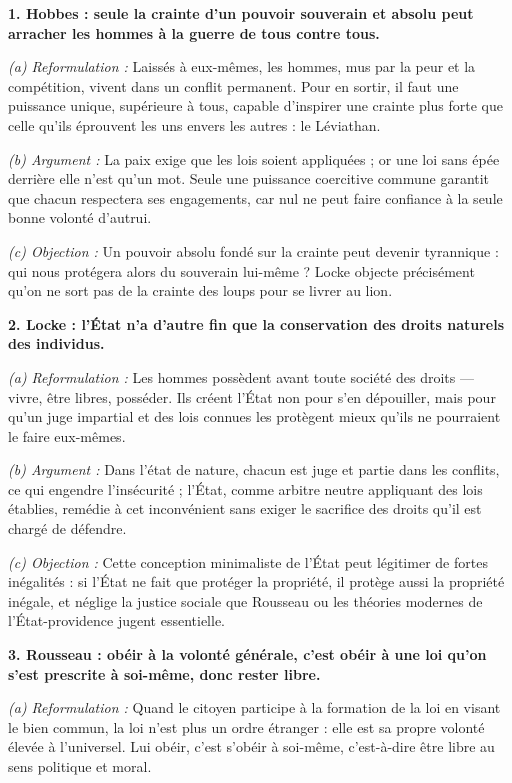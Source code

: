 \documentclass[11pt]{article}
\begin{document}
\begin{corrige}

\textbf{1. Hobbes : seule la crainte d'un pouvoir souverain et absolu peut arracher les hommes à la guerre de tous contre tous.}

\emph{(a) Reformulation :} Laissés à eux-mêmes, les hommes, mus par la peur et la compétition, vivent dans un conflit permanent. Pour en sortir, il faut une puissance unique, supérieure à tous, capable d'inspirer une crainte plus forte que celle qu'ils éprouvent les uns envers les autres : le Léviathan.

\emph{(b) Argument :} La paix exige que les lois soient appliquées ; or une loi sans épée derrière elle n'est qu'un mot. Seule une puissance coercitive commune garantit que chacun respectera ses engagements, car nul ne peut faire confiance à la seule bonne volonté d'autrui.

\emph{(c) Objection :} Un pouvoir absolu fondé sur la crainte peut devenir tyrannique : qui nous protégera alors du souverain lui-même ? Locke objecte précisément qu'on ne sort pas de la crainte des loups pour se livrer au lion.

\textbf{2. Locke : l'État n'a d'autre fin que la conservation des droits naturels des individus.}

\emph{(a) Reformulation :} Les hommes possèdent avant toute société des droits — vivre, être libres, posséder. Ils créent l'État non pour s'en dépouiller, mais pour qu'un juge impartial et des lois connues les protègent mieux qu'ils ne pourraient le faire eux-mêmes.

\emph{(b) Argument :} Dans l'état de nature, chacun est juge et partie dans les conflits, ce qui engendre l'insécurité ; l'État, comme arbitre neutre appliquant des lois établies, remédie à cet inconvénient sans exiger le sacrifice des droits qu'il est chargé de défendre.

\emph{(c) Objection :} Cette conception minimaliste de l'État peut légitimer de fortes inégalités : si l'État ne fait que protéger la propriété, il protège aussi la propriété inégale, et néglige la justice sociale que Rousseau ou les théories modernes de l'État-providence jugent essentielle.

\textbf{3. Rousseau : obéir à la volonté générale, c'est obéir à une loi qu'on s'est prescrite à soi-même, donc rester libre.}

\emph{(a) Reformulation :} Quand le citoyen participe à la formation de la loi en visant le bien commun, la loi n'est plus un ordre étranger : elle est sa propre volonté élevée à l'universel. Lui obéir, c'est s'obéir à soi-même, c'est-à-dire être libre au sens politique et moral.


\end{corrige}
\end{document}

